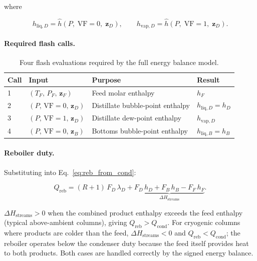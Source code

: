 \documentclass[11pt,a4paper]{article}
\theoremstyle{definition}
\theoremstyle{plain}
\begin{document}
where

\begin{equation}
 h_{\mathrm{liq},D} = \hat{h}(P,\; \mathrm{VF}{=}0,\; \bm{z}_D),
 \qquad
 h_{\mathrm{vap},D} = \hat{h}(P,\; \mathrm{VF}{=}1,\; \bm{z}_D).
\end{equation}

\paragraph{Required flash calls.}

\begin{table}[ht]
\centering
\caption{Four flash evaluations required by the full energy
 balance model.}
\label{tab:flash_calls}
\begin{tabular}{@{}llll@{}}
\toprule
Call & Input & Purpose & Result \\
\midrule
1 & $(T_F,\, P_F,\, \bm{z}_F)$ & Feed molar enthalpy & $h_F$ \\
2 & $(P,\, \mathrm{VF}{=}0,\, \bm{z}_D)$ & Distillate bubble-point enthalpy & $h_{\mathrm{liq},D} = h_D$ \\
3 & $(P,\, \mathrm{VF}{=}1,\, \bm{z}_D)$ & Distillate dew-point enthalpy & $h_{\mathrm{vap},D}$ \\
4 & $(P,\, \mathrm{VF}{=}0,\, \bm{z}_B)$ & Bottoms bubble-point enthalpy & $h_{\mathrm{liq},B} = h_B$ \\
\bottomrule
\end{tabular}
\end{table}

\paragraph{Reboiler duty.}
Substituting into Eq.~\eqref{eq:reb_from_cond}:

\begin{equation}
 Q_{\mathrm{reb}}
 = (R+1)\, F_D\, \lambda_D
 + \underbrace{F_D\, h_D + F_B\, h_B
  - F_F\, h_F}_{\Delta H_{\mathrm{streams}}}.
 \label{eq:Q_reb}
\end{equation}

$\Delta H_{\mathrm{streams}} > 0$ when the combined product enthalpy exceeds the feed enthalpy (typical above-ambient columns), giving $Q_{\mathrm{reb}} > Q_{\mathrm{cond}}$. For cryogenic columns where products are colder than the feed, $\Delta H_{\mathrm{streams}} < 0$ and $Q_{\mathrm{reb}} < Q_{\mathrm{cond}}$; the reboiler operates below the condenser duty because the feed itself provides heat to both products. Both cases are handled correctly by the signed energy balance.
\end{document}
